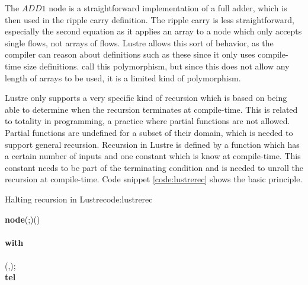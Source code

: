 The $ADD1$ node is a straightforward implementation of a full adder, which is then used in the ripple carry definition. 
The ripple carry is less straightforward, especially the second equation as it applies an array to a node which only accepts single flows, not arrays of flows.
Lustre allows this sort of behavior, as the compiler can reason about definitions such as these since it only uses compile-time size definitions. 
\citeauthor{halbwachs1993tutorial} call\cite{halbwachs1993tutorial} this polymorphism, but since this does not allow any length of arrays to be used, it is a limited kind of polymorphism. 

Lustre only supports a very specific kind of recursion which is based on being able to determine when the recursion terminates at compile-time.
This is related to totality in programming, a practice where partial functions are not allowed.
Partial functions are undefined for a subset of their domain, which is needed to support general recursion.
Recursion in Lustre is defined by a function which has a certain number of inputs and one constant which is know at compile-time. 
This constant needs to be part of the terminating condition and is needed to unroll the recursion at compile-time.
Code snippet \ref{code:lustrerec} shows the basic principle.

\begin{texexptitled}{Halting recursion in Lustre}{code:lustrerec}
\begin{hscode}\SaveRestoreHook
{}%
%
%
%
\>[B]{}\textbf{node}\;\;(\;\mathbin{:};\mathbin{:})\;\;(\mathbin{:}){}\<[E]%
\\
\>[B]{}\<[E]%
\\
\>[B]{}\<[5]%
\>[5]{}\textbf{with}\;\mathrel{=}\<[E]%
\\
\>[5]{}\<[7]%
\>[7]{}\;\<[E]%
\\
\>[5]{}\<[7]%
\>[7]{}\;\mathbin{+}\;(\mathbin{-},);{}\<[E]%
\\
\>[B]{}\textbf{tel}{}\<[E]%
\ColumnHook
\end{hscode}\resethooks
\end{texexptitled}


